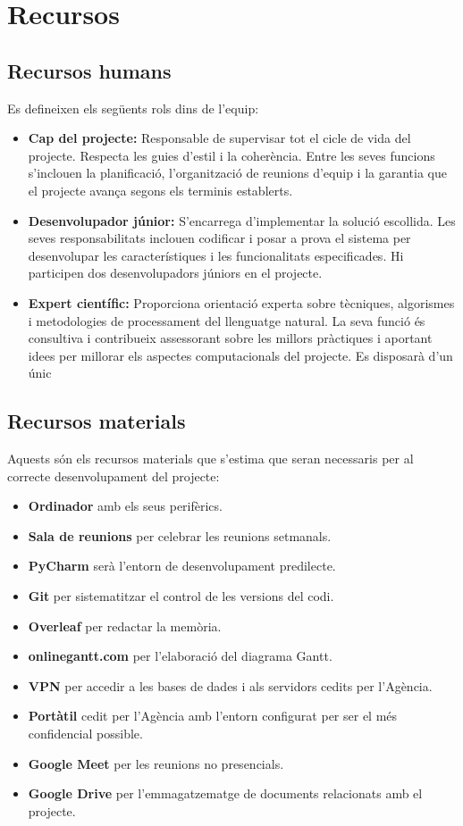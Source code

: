 \section{Recursos} \label{sec:recursos}

\subsection{Recursos humans}
Es defineixen els següents rols dins de l'equip:

\begin{itemize}
    \item \textbf{Cap del projecte:} Responsable de supervisar tot el cicle de vida del projecte. Respecta les guies d'estil i la coherència. Entre les seves funcions s'inclouen la planificació, l'organització de reunions d'equip i la garantia que el projecte avança segons els terminis establerts.
    \item \textbf{Desenvolupador júnior:} S'encarrega d'implementar la solució escollida. Les seves responsabilitats inclouen codificar i posar a prova el sistema per desenvolupar les característiques i les funcionalitats especificades. Hi participen dos desenvolupadors júniors en el projecte.
    \item \textbf{Expert científic:} Proporciona orientació experta sobre tècniques, algorismes i metodologies de processament del llenguatge natural. La seva funció és consultiva i contribueix assessorant sobre les millors pràctiques i aportant idees per millorar els aspectes computacionals del projecte. Es disposarà d'un únic 
\end{itemize}

\subsection{Recursos materials}
Aquests són els recursos materials que s'estima que seran necessaris per al correcte desenvolupament del projecte:

\begin{itemize}
    \item \textbf{Ordinador} amb els seus perifèrics.
    \item \textbf{Sala de reunions} per celebrar les reunions setmanals.
    \item \textbf{PyCharm} serà l'entorn de desenvolupament predilecte.
    \item \textbf{Git} per sistematitzar el control de les versions del codi.
    \item \textbf{Overleaf} per redactar la memòria.
    \item \textbf{onlinegantt.com} per l'elaboració del diagrama Gantt.
    \item \textbf{VPN} per accedir a les bases de dades i als servidors cedits per l'Agència.
    \item \textbf{Portàtil} cedit per l'Agència amb l'entorn configurat per ser el més confidencial possible.
    \item \textbf{Google Meet} per les reunions no presencials.
    \item \textbf{Google Drive} per l'emmagatzematge de documents relacionats amb el projecte.
\end{itemize}
